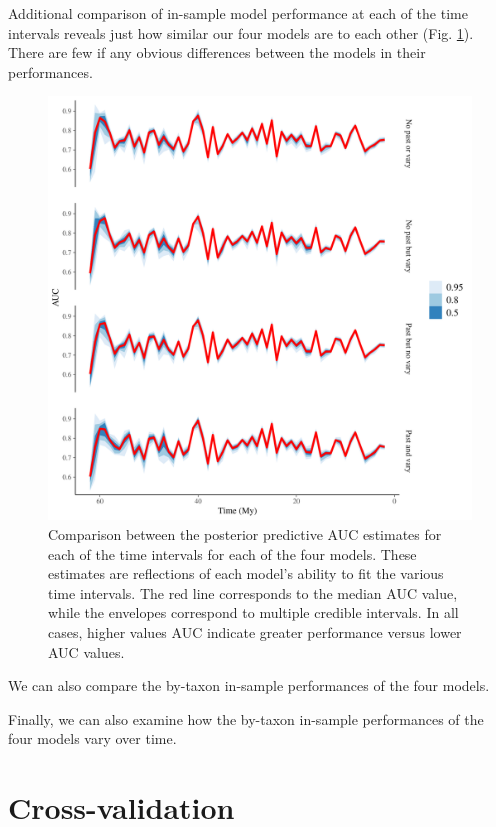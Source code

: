 \documentclass[12pt,letterpaper]{article}
\begin{document}
Additional comparison of in-sample model performance at each of the time intervals reveals just how similar our four models are to each other (Fig. \ref{fig:roc_ts}). There are few if any obvious differences between the models in their performances.
\begin{figure}[ht]
  \centering
  \includegraphics[width=\textwidth,height=0.5\textheight,keepaspectratio=true]{../results/figure/roc_ts}
  \caption{Comparison between the posterior predictive AUC estimates for each of the time intervals for each of the four models. These estimates are reflections of each model's ability to fit the various time intervals. The red line corresponds to the median AUC value, while the envelopes correspond to multiple credible intervals. In all cases, higher values AUC indicate greater performance versus lower AUC values.}
  \label{fig:roc_ts}
\end{figure}

We can also compare the by-taxon in-sample performances of the four models. 


Finally, we can also examine how the by-taxon in-sample performances of the four models vary over time.




\section{Cross-validation}
\end{document}
